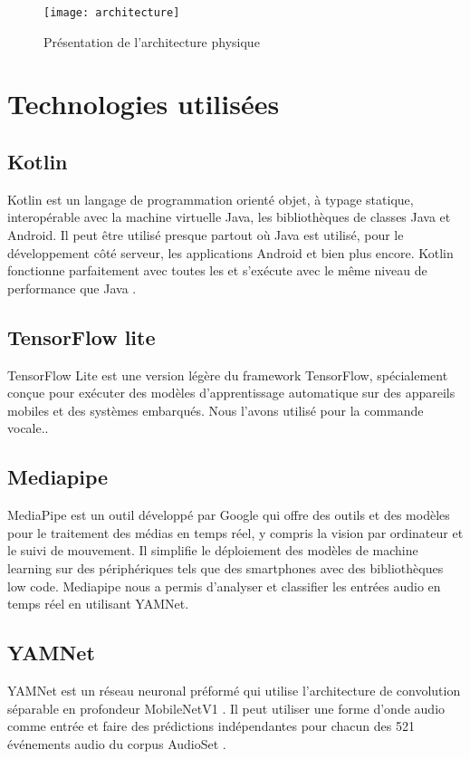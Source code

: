 \begin{figure}[H]
	\centering
	\texttt{[image: architecture]}
	\caption{Présentation de l'architecture physique}
\end{figure}

\section{Technologies utilisées}
\subsection{Kotlin}
Kotlin est un langage de programmation orienté objet, à typage statique, interopérable avec la machine virtuelle Java, les bibliothèques de classes Java et Android.
Il peut être utilisé presque partout où Java est utilisé, pour le développement côté serveur, les applications Android et bien plus encore. Kotlin fonctionne parfaitement avec toutes les et s'exécute avec le même niveau de performance que Java \cite{dmitry_jemerov_kotlin}.

\subsection{TensorFlow lite}
TensorFlow Lite est une version légère du framework TensorFlow, spécialement conçue pour exécuter des modèles d'apprentissage automatique sur des appareils mobiles et des systèmes embarqués. Nous l'avons utilisé pour la commande vocale.\cite{ml_2023}.

\subsection{Mediapipe}
MediaPipe est un outil développé par Google qui offre des outils et des modèles pour le traitement des médias en temps réel, y compris la vision par ordinateur et le suivi de mouvement. Il simplifie le déploiement des modèles de machine learning sur des périphériques tels que des smartphones avec des bibliothèques low code.
Mediapipe nous a permis d'analyser et classifier les entrées audio en temps réel en utilisant YAMNet.

\subsection{YAMNet}
YAMNet\cite{yamnet} est un réseau neuronal préformé qui utilise l'architecture de convolution séparable en profondeur MobileNetV1 \cite{andrew_g_howard_menglong_zhu_bo_chen_dmitry_kalenichenko_weijun_wang_tobias_weyand_marco_andreetto_hartwig_adam_mobilenets}. Il peut utiliser une forme d'onde audio comme entrée et faire des prédictions indépendantes pour chacun des 521 événements audio du corpus AudioSet \cite{dataset_large_scale}.

